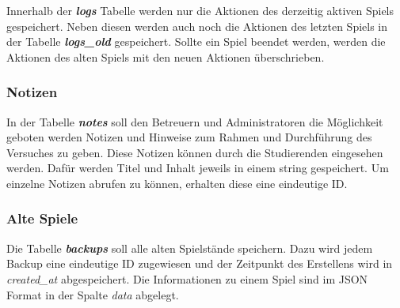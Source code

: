Innerhalb der \textbf{\textit{logs}} Tabelle werden nur die Aktionen des derzeitig aktiven Spiels gespeichert. Neben diesen werden auch noch die Aktionen des letzten Spiels in der Tabelle \textbf{\textit{logs\_old}} gespeichert. Sollte ein Spiel beendet werden, werden die Aktionen des alten Spiels mit den neuen Aktionen überschrieben.

\subsubsection{Notizen}
In der Tabelle \textbf{\textit{notes}} soll den Betreuern und Administratoren die Möglichkeit geboten werden Notizen und Hinweise zum Rahmen und Durchführung des Versuches zu geben. Diese Notizen können durch die Studierenden eingesehen werden. Dafür werden Titel und Inhalt jeweils in einem string gespeichert. Um einzelne Notizen abrufen zu können, erhalten diese eine eindeutige ID.

\subsubsection{Alte Spiele}
Die Tabelle \textbf{\textit{backups}} soll alle alten Spielstände speichern. Dazu wird jedem Backup eine eindeutige ID zugewiesen und der Zeitpunkt des Erstellens wird in \textit{created\_at} abgespeichert. Die Informationen zu einem Spiel sind im JSON Format in der Spalte \textit{data} abgelegt.